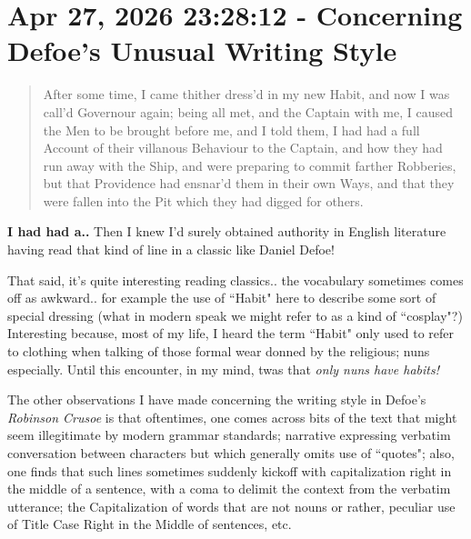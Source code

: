 \documentclass[a4paper]{article}
\begin{document}
\section{Apr 27, 2026 23:28:12 - Concerning Defoe's Unusual Writing Style}
\label{SEC67}


\noindent
\begin{minipage}{1\textwidth}
\vspace{1em}
\begin{quotation}
{\ttfamily


After some time, I came thither dress’d in my new Habit, and now I was call’d Governour again; being all met, and the Captain with me, I caused the Men to be brought before me, and I told them, I had had a full Account of their villanous Behaviour to the Captain, and how they had run away with the Ship, and were preparing to commit farther Robberies, but that Providence had ensnar’d them in their own Ways, and that they were fallen into the Pit which they had digged for others.


}
\end{quotation}
\vspace{1em}
\end{minipage}




\textbf{I had had a..}  Then I knew I'd surely obtained authority in English literature having read that kind of line in a classic like Daniel Defoe! 

That said, it's quite interesting reading classics.. the vocabulary sometimes comes off as awkward.. for example the use of ``Habit" here to describe some sort of special dressing (what in modern speak we might refer to as a kind of ``cosplay"?) Interesting because, most of my life, I heard the term ``Habit" only used to refer to clothing when talking of those formal wear donned by the religious; nuns especially. Until this encounter, in my mind, twas that \textit{only nuns have habits!}

The other observations I have made concerning the writing style in Defoe's \textit{Robinson Crusoe} is that oftentimes, one comes across bits of the text that might seem illegitimate by modern grammar standards; narrative expressing verbatim conversation between characters but which generally omits use of ``quotes"; also, one finds that such lines sometimes suddenly kickoff with capitalization right in the middle of a sentence, with a coma to delimit the context from the verbatim utterance; the Capitalization of words that are not nouns or rather, peculiar use of Title Case Right in the Middle of sentences, etc.
\end{document}
